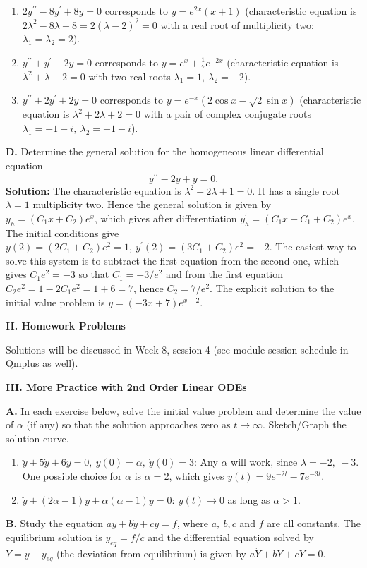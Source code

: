 \documentclass[11pt,a4paper,twoside]{article}
\begin{document}
	\begin{enumerate}[\bfseries 1)]
		\item $2y^{\prime\prime} - 8y^\prime + 8y = 0$ corresponds to $y = e^{2x}(x+1)$ (characteristic equation is $2\lambda^2 - 8\lambda + 8 = 2(\lambda - 2)^2 = 0$ with a real root of multiplicity two: $\lambda_1 = \lambda_2 = 2$).
		\item $y^{\prime\prime} + y^\prime - 2y = 0$ corresponds to $y = e^x + \frac{1}{7}e^{-2x}$ (characteristic equation is $\lambda^2 + \lambda -2 = 0$ with two real roots $\lambda_1 = 1,\ \lambda_2 = -2$).
		\item $y^{\prime\prime} + 2y^\prime + 2y = 0$ corresponds to $y = e^{-x}(2\cos x - \sqrt{2}\sin x)$ (characteristic equation is $\lambda^2 + 2\lambda + 2 = 0$ with a pair of complex conjugate roots $\lambda_1 = -1+i,\ \lambda_2 = -1-i$).
	\end{enumerate}
	\textbf{D.} Determine the general solution for the homogeneous linear differential equation
	$$
	y^{\prime\prime} - 2y + y = 0.
	$$
	\textbf{Solution:} The characteristic equation is $\lambda^2 - 2\lambda + 1 = 0$. It has a single root $\lambda = 1$ multiplicity two. Hence the general solution is given by $y_h = (C_1x + C_2)e^x$, which gives after differentiation $y^\prime_h = (C_1x + C_1 + C_2)e^x$. The initial conditions give $y(2) = (2C_1 + C_2)e^2 = 1,\ y^\prime(2) = (3C_1 + C_2)e^2 = -2$. The easiest way to solve this system is to subtract the first equation from the second one, which gives $C_1e^2 = -3$ so that $C_1 = -3/e^2$ and from the first equation $C_2e^2 = 1-2C_1e^2 = 1 + 6 = 7$, hence $C_2 = 7/e^2$. The explicit solution to the initial value problem is $y = (-3x+7)e^{x-2}$.\par
	\textbf{II. Homework Problems}\par
	Solutions will be discussed in Week 8, session 4 (see module session schedule in Qmplus as well).\par
	\textbf{III. More Practice with 2nd Order Linear ODEs}\par
	\textbf{A.} In each exercise below, solve the initial value problem and determine the value of $\alpha$ (if any) so that the solution approaches zero as $t \to \infty$. Sketch/Graph the solution curve.
	\begin{enumerate}
		\item $\ddot{y} + 5\dot{y} + 6y = 0,\ y(0) = \alpha,\ \dot{y}(0) = 3$: Any $\alpha$ will work, since $\lambda = -2,\ -3$. One possible choice for $\alpha$ is $\alpha = 2$, which gives $y(t) = 9e^{-2t} - 7e^{-3t}$.
		\item $\ddot{y} + (2\alpha-1)\dot{y} + \alpha(\alpha-1)y = 0:\ y(t)\to 0$ as long as $\alpha > 1$.
	\end{enumerate}
	\textbf{B.} Study the equation $a\ddot{y} + b\dot{y} + cy = f$, where $a,\ b, c$ and $f$ are all constants. The equilibrium solution is $y_{eq} = f/c$ and the differential equation solved by $Y = y - y_{eq}$ (the deviation from equilibrium) is given by $a\ddot{Y} + b\dot{Y} + cY = 0$.
\end{document}
